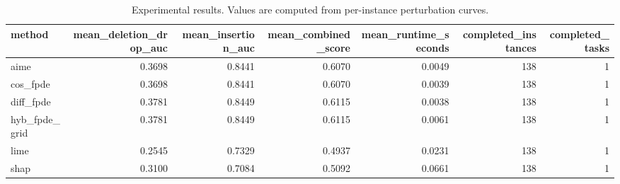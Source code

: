\begin{table}[t]
\caption{Experimental results. Values are computed from per-instance perturbation curves.}
\label{tab:main_results_computed}
\centering
\begin{tabular}{lrrrrrr}
\toprule
method & mean\_deletion\_drop\_auc & mean\_insertion\_auc & mean\_combined\_score & mean\_runtime\_seconds & completed\_instances & completed\_tasks \\
\midrule
aime & 0.3698 & 0.8441 & 0.6070 & 0.0049 & 138 & 1 \\
cos\_fpde & 0.3698 & 0.8441 & 0.6070 & 0.0039 & 138 & 1 \\
diff\_fpde & 0.3781 & 0.8449 & 0.6115 & 0.0038 & 138 & 1 \\
hyb\_fpde\_grid & 0.3781 & 0.8449 & 0.6115 & 0.0061 & 138 & 1 \\
lime & 0.2545 & 0.7329 & 0.4937 & 0.0231 & 138 & 1 \\
shap & 0.3100 & 0.7084 & 0.5092 & 0.0661 & 138 & 1 \\
\bottomrule
\end{tabular}

\end{table}
